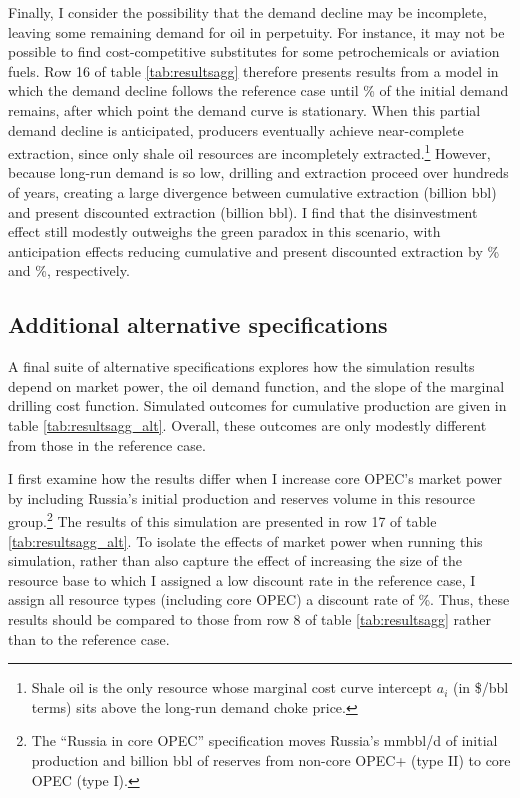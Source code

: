 \documentclass[12pt]{article}
\begin{document}
Finally, I consider the possibility that the demand decline may be incomplete, leaving some remaining demand for oil in perpetuity. For instance, it may not be possible to find cost-competitive substitutes for some petrochemicals or aviation fuels. Row 16 of table \ref{tab:resultsagg} therefore presents results from a model in which the demand decline follows the reference case until \unskip\% of the initial demand remains, after which point the demand curve is stationary. When this partial demand decline is anticipated, producers eventually achieve near-complete extraction, since only shale oil resources are incompletely extracted.\footnote{Shale oil is the only resource whose marginal cost curve intercept $a_i$ (in \$/bbl terms) sits above the long-run demand choke price.} However, because long-run demand is so low, drilling and extraction proceed over hundreds of years, creating a large divergence between cumulative extraction (billion bbl) and present discounted extraction (billion bbl). I find that the disinvestment effect still modestly outweighs the green paradox in this scenario, with anticipation effects reducing cumulative and present discounted extraction by \unskip\% and \unskip\%, respectively.



\subsection{Additional alternative specifications} \label{sec:results_alt3}

A final suite of alternative specifications explores how the simulation results depend on market power, the oil demand function, and the slope of the marginal drilling cost function. Simulated outcomes for cumulative production are given in table \ref{tab:resultsagg_alt}. Overall, these outcomes are only modestly different from those in the reference case.

I first examine how the results differ when I increase core OPEC's market power by including Russia's initial production and reserves volume in this resource group.\footnote{The ``Russia in core OPEC'' specification moves Russia's mmbbl/d of initial production and billion bbl of reserves from non-core OPEC+ (type II) to core OPEC (type I).} The results of this simulation are presented in row 17 of table \ref{tab:resultsagg_alt}. To isolate the effects of market power when running this simulation, rather than also capture the effect of increasing the size of the resource base to which I assigned a low discount rate in the reference case, I assign all resource types (including core OPEC) a discount rate of \unskip\%. Thus, these results should be compared to those from row 8 of table \ref{tab:resultsagg} rather than to the reference case. 
\end{document}
